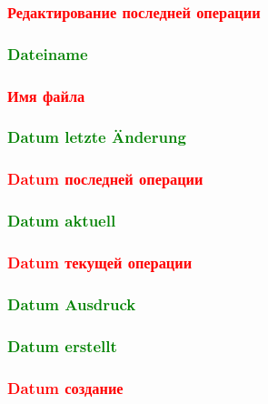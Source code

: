 \documentclass[14pt,a4paper]{book}
\newcommand{\DE}[1]{\textcolor{green}{#1}}
\newcommand{\RU}[1]{\textcolor{red}{#1}}
\begin{document}
			\RU{\subsubsection{Редактирование последней операции}}
			\DE{\subsubsection{Dateiname}}
			\RU{\subsubsection{Имя файла}}
			\DE{\subsubsection{Datum letzte Änderung}}
			\RU{\subsubsection{Datum последней операции}}
			\DE{\subsubsection{Datum aktuell}}
			\RU{\subsubsection{Datum текущей операции}}
			\DE{\subsubsection{Datum Ausdruck}}
			\DE{\subsubsection{Datum erstellt}}
			\RU{\subsubsection{Datum создание}}
\end{document}

